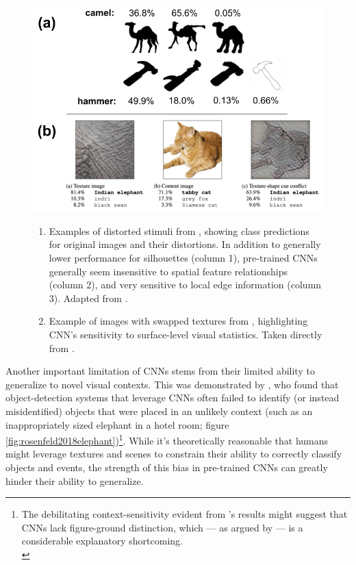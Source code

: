 \documentclass[12pt]{article}
\let\oldtextcite=\textcite
\renewcommand{\textcite}[1]{\textcolor[rgb]{0, .121, .388}{\oldtextcite{#1}}}
\begin{document}
\begin{figure}[!h]
    \centering
    \includegraphics[scale=.45]{figures/cnnFails.png}
    \caption{}
        \begin{enumerate}[label=(\alph*)]
            \item Examples of distorted stimuli from \textcite{baker2018deep}, showing class predictions for original images and their distortions. In addition to generally lower performance for silhouettes (column 1), pre-trained CNNs generally seem insensitive to spatial feature relationships (column 2), and very sensitive to local edge information (column 3). Adapted from \textcite{baker2018contour}. 
            \item Example of images with swapped textures from \textcite{geirhos2018imagenet}, highlighting CNN's sensitivity to surface-level visual statistics. Taken directly from \textcite{geirhos2018imagenet}.
        \end{enumerate}
    \label{fig:cnnFails}
\end{figure} 


Another important limitation of CNNs stems from their limited ability to generalize to novel visual contexts. This was demonstrated by \textcite{rosenfeld2018elephant}, who found that object-detection systems that leverage CNNs often failed to identify (or instead misidentified) objects that were placed in an unlikely context (such as an inappropriately sized elephant in a hotel room; figure \ref{fig:rosenfeld2018elephant})\footnote{The debilitating context-sensitivity evident from \textcite{rosenfeld2018elephant}'s results might suggest that CNNs lack figure-ground distinction, which --- as argued by \textcite{serre2019deep} --- is a considerable explanatory shortcoming. \\}. While it's theoretically reasonable that humans might leverage textures and scenes to constrain their ability to correctly classify objects and events, the strength of this bias in pre-trained CNNs can greatly hinder their ability to generalize.
\end{document}

